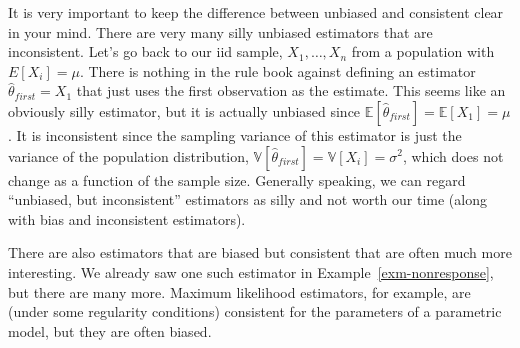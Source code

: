 \documentclass[
  letterpaper,
  DIV=11,
  numbers=noendperiod]{scrreprt}
\newcommand{\E}{\mathbb{E}}
\newcommand{\V}{\mathbb{V}}
\theoremstyle{definition}
\theoremstyle{plain}
\theoremstyle{definition}
\theoremstyle{remark}
\begin{document}
It is very important to keep the difference between unbiased and
consistent clear in your mind. There are very many silly unbiased
estimators that are inconsistent. Let's go back to our iid sample,
\(X_1, \ldots, X_n\) from a population with \(E[X_i] = \mu\). There is
nothing in the rule book against defining an estimator
\(\widehat{\theta}_{first} = X_1\) that just uses the first observation
as the estimate. This seems like an obviously silly estimator, but it is
actually unbiased since
\(\E[\widehat{\theta}_{first}] = \E[X_1] = \mu\). It is inconsistent
since the sampling variance of this estimator is just the variance of
the population distribution,
\(\V[\widehat{\theta}_{first}] = \V[X_i] = \sigma^2\), which does not
change as a function of the sample size. Generally speaking, we can
regard ``unbiased, but inconsistent'' estimators as silly and not worth
our time (along with bias and inconsistent estimators).

There are also estimators that are biased but consistent that are often
much more interesting. We already saw one such estimator in
Example~\ref{exm-nonresponse}, but there are many more. Maximum
likelihood estimators, for example, are (under some regularity
conditions) consistent for the parameters of a parametric model, but
they are often biased.
\end{document}
